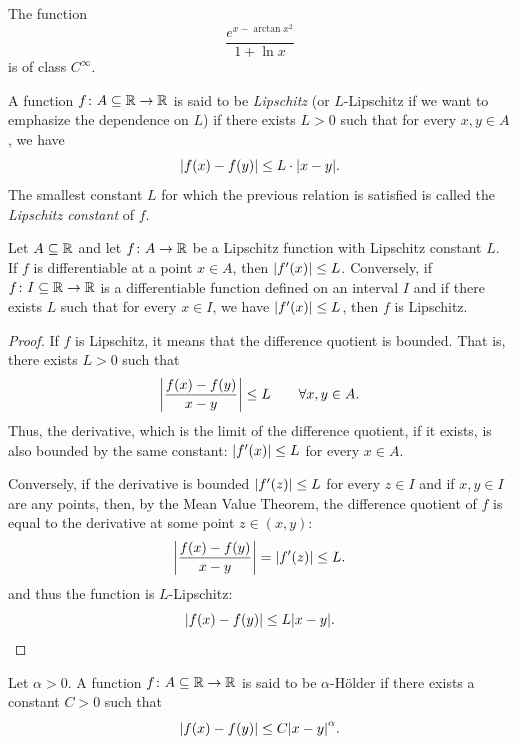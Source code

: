 \begin{example}
  The function 
  \[
    \frac{e^{x-\arctan x^2}}{1+\ln x}
  \]
  is of class $C^\infty$.
\end{example}

\begin{definition}
\mymark{**}
A function $f\colon A\subseteq {\mathbb R} \to {\mathbb R}$ is said to be \emph{Lipschitz} (or
$L$-Lipschitz if we want to emphasize the dependence on $L$) if there exists
$L>0$ such that for every $x,y\in A$, we have
\[
  {\left|f(x) - f(y)\right|} \le L\cdot  {\left|x-y\right|}.
\]
The smallest constant $L$ for which the previous relation is satisfied is called
the \emph{Lipschitz constant}
of $f$.
\end{definition}

\begin{theorem}
\mymark{**}
Let $A\subseteq {\mathbb R}$ and let $f\colon A \to {\mathbb R}$ be a Lipschitz function with
Lipschitz constant $L$.
If $f$ is differentiable at a point $x\in A$, then ${\left|f'(x)\right|}\le L$.
Conversely, if $f\colon I \subseteq {\mathbb R} \to {\mathbb R}$ is a differentiable function
defined on an interval $I$ and if there exists $L$ such that for every $x\in I$,
we have ${\left|f'(x)\right|}\le L$, then $f$ is Lipschitz.
\end{theorem}
%
\begin{proof}
If $f$ is Lipschitz, it means that the difference quotient is bounded.
That is, there exists $L>0$ such that
\[
  {\left|\frac{f(x) - f(y)}{x-y}\right|} \le L \qquad \forall x,y\in A.
\]
Thus, the derivative, which is the limit of the difference quotient, if it
exists, is also bounded by the same constant: ${\left|f'(x)\right|}\le L$ for every $x
\in A$.

Conversely, if the derivative is bounded ${\left|f'(z)\right|}\le L$ for every $z \in I$
and if $x,y\in I$ are any points, then, by the Mean Value Theorem, the
difference quotient of $f$ is equal to the derivative at some point $z\in(x,y)$:
\[
  {\left|\frac{f(x) - f(y)}{x-y}\right|} = {\left|f'(z)\right|} \le L.
\]
and thus the function is $L$-Lipschitz:
\[
  {\left|f(x)- f(y)\right|} \le L {\left|x-y\right|}.
\]
\end{proof}

\begin{definition}
Let $\alpha>0$.
A function $f\colon A \subseteq {\mathbb R} \to {\mathbb R}$ is said to be $\alpha$-Hölder if
there exists a constant $C>0$ such that
\begin{equation}\label{eq:2964536}
  {\left|f(x) - f(y)\right|} \le C {\left|x-y\right|}^\alpha.
\end{equation}
\end{definition}

